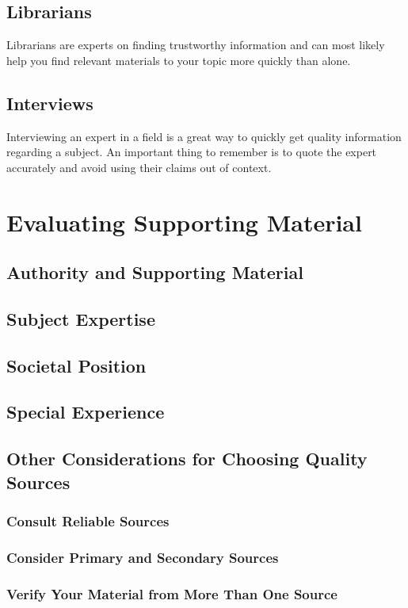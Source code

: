 \documentclass{report}
\begin{document}
        \subsection{Librarians}
            Librarians are experts on finding trustworthy information and can most likely help you find relevant materials to your topic more quickly than alone.

        \subsection{Interviews}
            Interviewing an expert in a field is a great way to quickly get quality information regarding a subject. An important thing to remember is to quote the expert accurately and avoid using their claims out of context.
        
    \section{Evaluating Supporting Material}
        \subsection{Authority and Supporting Material}
        \subsection{Subject Expertise}
        \subsection{Societal Position}
        \subsection{Special Experience}
        \subsection{Other Considerations for Choosing Quality Sources}
        \subsubsection{Consult Reliable Sources}
        \subsubsection{Consider Primary and Secondary Sources}
        \subsubsection{Verify Your Material from More Than One Source}
\end{document}
